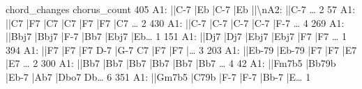 \documentclass[letterpaper,10pt,english]{sphinxmanual}
\begin{document}
{\begin{sphinxVerbatim}[commandchars=\\\{\}]
                                         chord\_changes  chorus\_count
405  A1: ||C-7   |Eb   |C-7   |Eb   ||\textbackslash{}nA2: ||C-7  {\ldots}             2
57   A1: ||C7   |F7   |C7   |C7   |F7   |F7   |C7  {\ldots}             2
430  A1: ||C-7     |C-7     |C-7     |C-7     |F-7 {\ldots}             4
269  A1: ||Bbj7   |Bbj7   |F-7   |Bb7   |Ebj7   |Eb{\ldots}             1
151  A1: ||Dj7   |Dj7   |Ebj7   |Ebj7   |F7   |F7  {\ldots}             1
394  A1: ||F7   |F7   |F7 D-7 |G-7 C7 |F7   |F7   |{\ldots}             3
203  A1: ||Eb-79   |Eb-79   |F7   |F7   |E7   |E7  {\ldots}             2
300  A1: ||Bb7   |Bb7   |Bb7   |Bb7   |Bb7   |Bb7  {\ldots}             4
42   A1: ||Fm7b5   |Bb79b   |Eb-7   |Ab7   |Dbo7 Db{\ldots}             6
351  A1: ||Gm7b5   |C79b   |F-7   |F-7   |Bb-7   |E{\ldots}             1
\end{sphinxVerbatim}
}

{
\begin{sphinxVerbatim}[commandchars=\\\{\}]
\llap{\color{nbsphinxin}[8]:\,\hspace{\fboxrule}\hspace{\fboxsep}}
\end{sphinxVerbatim}
}
\end{document}
